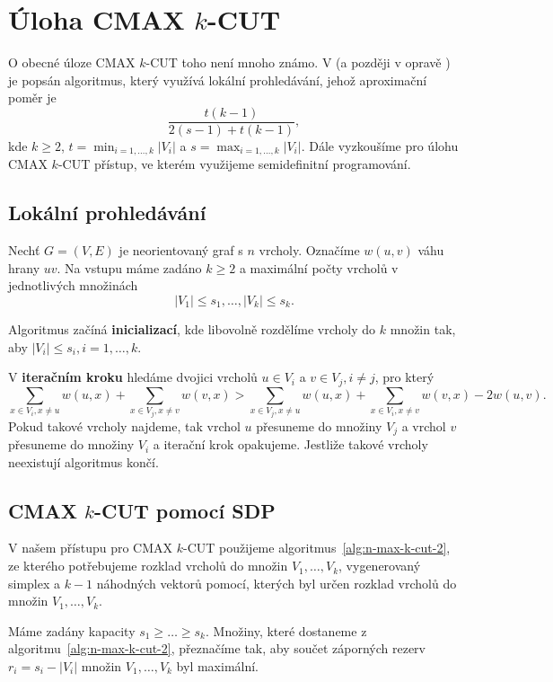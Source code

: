 \section{Úloha CMAX $k$-CUT}

O obecné úloze CMAX $k$-CUT toho není mnoho známo. V \cite{cmax-k-cut-1} (a později v opravě \cite{cmax-k-cut-2}) je popsán algoritmus, který využívá lokální prohledávání, jehož aproximační poměr je
$$
    \frac{t(k-1)}{2(s-1)+t(k-1)},
$$
kde $k\geq 2$, $t = \min_{i=1,\dots,k} |V_i|$ a $s = \max_{i=1,\dots,k} |V_i|$. Dále vyzkoušíme pro úlohu CMAX $k$-CUT přístup, ve kterém využijeme semidefinitní programování.

\subsection{Lokální prohledávání}

Nechť $G = (V,E)$ je neorientovaný graf s $n$ vrcholy. Označíme $w(u,v)$ váhu hrany $uv$. Na vstupu máme zadáno $k \geq 2$ a maximální počty vrcholů v jednotlivých množinách
$$
    |V_1| \leq s_1, \dots, |V_k| \leq s_k.
$$

Algoritmus začíná \textbf{inicializací}, kde libovolně rozdělíme vrcholy do $k$ množin tak, aby $|V_i| \leq s_i, i = 1, \dots, k$.

V \textbf{iteračním kroku} hledáme dvojici vrcholů $u \in V_i$ a $v \in V_j, i \neq j$, pro který
$$
    \sum_{x \in V_i, x \neq u} w(u,x) + \sum_{x \in V_j, x \neq v} w(v,x) > 
    \sum_{x \in V_j, x \neq u} w(u,x) + \sum_{x \in V_i, x \neq v} w(v,x) - 2 w(u,v).
$$
Pokud takové vrcholy najdeme, tak vrchol $u$ přesuneme do množiny $V_j$ a vrchol $v$ přesuneme do množiny $V_i$ a iterační krok opakujeme. Jestliže takové vrcholy neexistují algoritmus končí.

\subsection{CMAX $k$-CUT pomocí SDP}

V našem přístupu pro CMAX $k$-CUT použijeme algoritmus~\ref{alg:n-max-k-cut-2}, ze kterého potřebujeme rozklad vrcholů do množin $V_1, \dots, V_k$, vygenerovaný simplex a $k-1$ náhodných vektorů pomocí, kterých byl určen rozklad vrcholů do množin $V_1, \dots, V_k$.

Máme zadány kapacity $s_1 \geq \dots \geq s_k$. Množiny, které dostaneme z algoritmu~\ref{alg:n-max-k-cut-2}, přeznačíme tak, aby součet záporných rezerv $r_i = s_i - |V_i|$ množin $V_1, \dots, V_k$ byl maximální.

